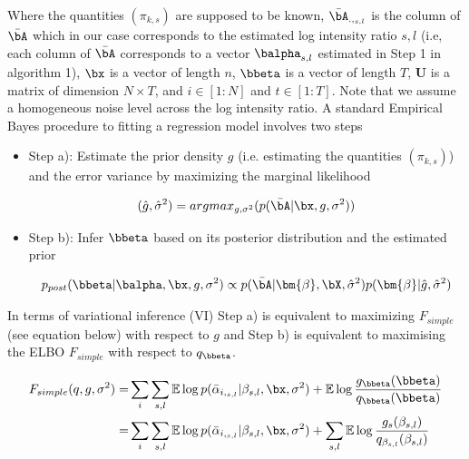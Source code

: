 Where the quantities $(\pi_{k,s})$ are supposed to be known, $ \bar{\bA}_{.,_{s,l}}$ is the column of $\bar{\bA}$ which in our case corresponds to the estimated log intensity ratio $s,l$ (i.e, each column of $\bar{\bA}$ corresponds to a vector $\balpha_{s,l}$ estimated in Step 1 in algorithm 1), $\bx$ is a vector of length $n$, $ \bbeta$ is a vector of length $T$, $\bm{U}$ is a matrix of dimension $N\times T$, and   $i \in [1:N]$ and $ t \in [1:T]$. Note that we assume a homogeneous noise level across the log intensity ratio. A standard Empirical Bayes procedure  to fitting a regression model involves two steps

\begin{itemize}
    \item{Step a):} Estimate the prior density $g$ (i.e. estimating the quantities $(\pi_{k ,s})$) and the error variance by maximizing the marginal likelihood

    \begin{align}
        (\hat{g}, \hat{\sigma }^2) =argmax_{ g ,  \sigma  ^2}( p(\bar{\bA}| \bx , g, \sigma^2))
    \end{align}
    \item{Step b):}  Infer $ \bbeta$ based on its posterior distribution and the estimated prior

\begin{align}
    p_{post}( \bbeta |\balpha,\bx , g, \sigma^2) \propto p( \bar{\bA}| \bm{\beta }  ,\bX ,\hat{\sigma }^2) p(\bm{\beta }|   \hat{g}, \hat{\sigma }^2)
\end{align}
    
\end{itemize}

In terms of variational inference (VI) Step   a) is equivalent to maximizing $F_{simple}$ (see equation below) with respect to $g $ and Step  b) is equivalent to maximising the ELBO $F_{simple}$ with respect to $q_{\bbeta}$.



\begin{align}\label{eq:elbo_simpleSFR}
   F_{simple}(q, g,\sigma^2) = & \sum_i\sum_{s,l} \mathbb{E}  \log p(\bar{\alpha}_{i,_{s,l}}|\beta_{ s,l},\bx, \sigma^2) +   \mathbb{E} \log \frac{g_{\bbeta  } (\bbeta  ) }{q_{\bbeta  } (\bbeta )} \\
   =& \sum_i\sum_{s,l} \mathbb{E}  \log p(\bar{\alpha}_{i,_{s,l}}|\beta_{ s,l},\bx, \sigma^2) + \sum_{s,l} \mathbb{E} \log \frac{g_{s} (\beta_{ s,l} ) }{q_{\beta_{s,l} } (\beta_{s,l} )}
\end{align}



